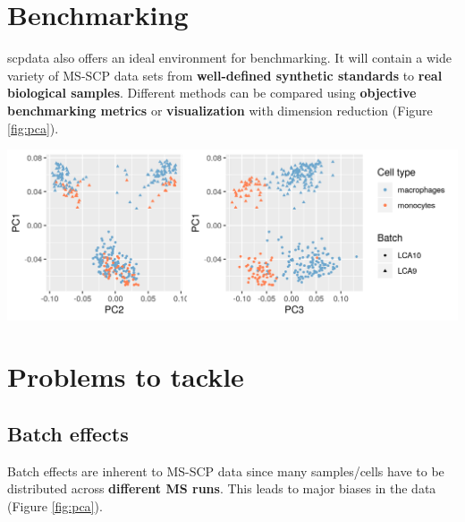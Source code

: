\documentclass{article}
\newcommand{\hcode}[2][lgray]{{\ttfamily\color{vdgray}\colorbox{#1}{#2}}}
\begin{document}
\begin{multicols}{2}
\begin{minipage}[t]{\linewidth}
  \section*{\huge Benchmarking}
  \large
  \hcode{scpdata} also offers an ideal environment for benchmarking. It will contain a wide variety of MS-SCP data sets from \textbf{well-defined synthetic standards} to \textbf{real biological samples}. Different methods can be compared using \textbf{objective benchmarking metrics} or \textbf{visualization} with dimension reduction (Figure \ref{fig:pca}).
  \begin{center}
    \includegraphics[width=\textwidth]{figs/PCA.png}
  \end{center}
  \label{fig:pca}

\end{minipage}

\noindent
\begin{minipage}[t]{\linewidth}
  \vspace{0.35cm}
  \section*{\huge Problems to tackle}
  \vspace{0.15cm}
\end{minipage}
  
\noindent
\begin{minipage}[h]{0.35\linewidth}
  \subsection*{Batch effects}
  \large
  Batch effects are inherent to MS-SCP data since many samples/cells have to be distributed across \textbf{different MS runs}. This leads to major biases in the data (Figure \ref{fig:pca}).

\end{minipage}
\end{multicols}
\end{document}
